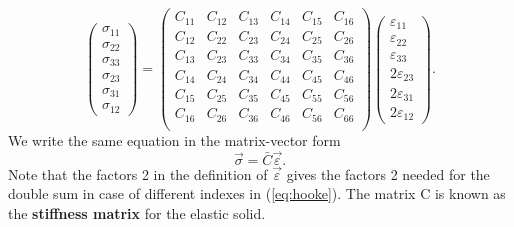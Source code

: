 \begin{equation}\label{eq:stress_matrix}
  \left(\begin{array}{c}
    \sigma_{11} \\
    \sigma_{22} \\
    \sigma_{33} \\
    \sigma_{23} \\
    \sigma_{31} \\
    \sigma_{12}
  \end{array}\right)
  =
  \left(
    \begin{array}{cccccc}
      C_{11} & C_{12} & C_{13} & C_{14} & C_{15} & C_{16} \\
      C_{12} & C_{22} & C_{23} & C_{24} & C_{25} & C_{26} \\
      C_{13} & C_{23} & C_{33} & C_{34} & C_{35} & C_{36} \\
      C_{14} & C_{24} & C_{34} & C_{44} & C_{45} & C_{46} \\
      C_{15} & C_{25} & C_{35} & C_{45} & C_{55} & C_{56} \\
      C_{16} & C_{26} & C_{36} & C_{46} & C_{56} & C_{66} \\
    \end{array}
  \right)
  \left(\begin{array}{c}
    \varepsilon_{11} \\
    \varepsilon_{22} \\
    \varepsilon_{33} \\
    2\varepsilon_{23} \\
    2\varepsilon_{31} \\
    2\varepsilon_{12}
  \end{array}\right).
\end{equation}
%
We write the same equation in the matrix-vector form
%
\begin{equation}
\label{eq:sigmavector}
\vec\sigma=\bar C\vec\varepsilon.
\end{equation}
%
Note that the factors 2 in the definition of $\vec\varepsilon$ gives
the factors 2 needed for the double sum in case of different indexes
in (\ref{eq:hooke}).  The matrix C is known as the {\bf stiffness
matrix} for the elastic solid.

